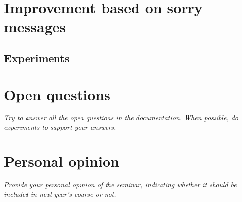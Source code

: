 \documentclass[a4paper, 10pt]{article}
\begin{document}
\section{Improvement based on sorry messages}
\label{sec:improvement}

\subsection{Experiments}

\section{Open questions}

\textit{Try to answer all the open questions in the documentation. When possible, do experiments to support your answers.}

\section{Personal opinion}

\textit{Provide your personal opinion of the seminar, indicating whether it should be included in next year's course or not.}
\end{document}
